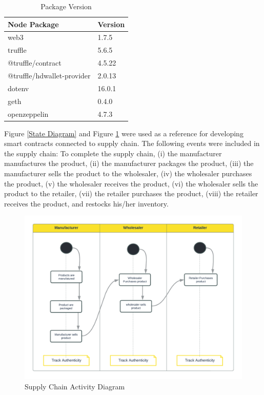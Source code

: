 \vspace{.5cm}

\begin{table}[h]
\small
\centering
\caption{Package Version}
\label{Package Version}
\begin{tabular}{|l| l|}
\hline
\textbf{Node Package} & \textbf{Version} \\ 
\hline\hline
web3 & 1.7.5\\ \hline
truffle & 5.6.5\\ \hline 
@truffle/contract & 4.5.22\\ \hline 
@truffle/hdwallet-provider & 2.0.13\\ \hline
dotenv & 16.0.1\\ \hline
geth & 0.4.0\\ \hline
openzeppelin & 4.7.3\\ \hline
\hline 
\end{tabular}
\end{table}

\vspace{.5cm}

Figure \ref{State Diagram} and Figure \ref{Activity Diagram} were used as a reference for developing smart contracts connected to supply chain. The following events were included in the supply chain: To complete the supply chain, (i) the manufacturer manufactures the product, (ii) the manufacturer packages the product, (iii) the manufacturer sells the product to the wholesaler, (iv) the wholesaler purchases the product, (v) the wholesaler receives the product, (vi) the wholesaler sells the product to the retailer, (vii) the retailer purchases the product, (viii) the retailer receives the product, and restocks his/her inventory.

\vspace{.5cm}

\begin{figure}[h]
\centering
  \includegraphics[width=12cm]{includes/figures/Activity Diagram.png} 
  \caption{Supply Chain Activity Diagram}
  \label{Activity Diagram}
\end{figure}

